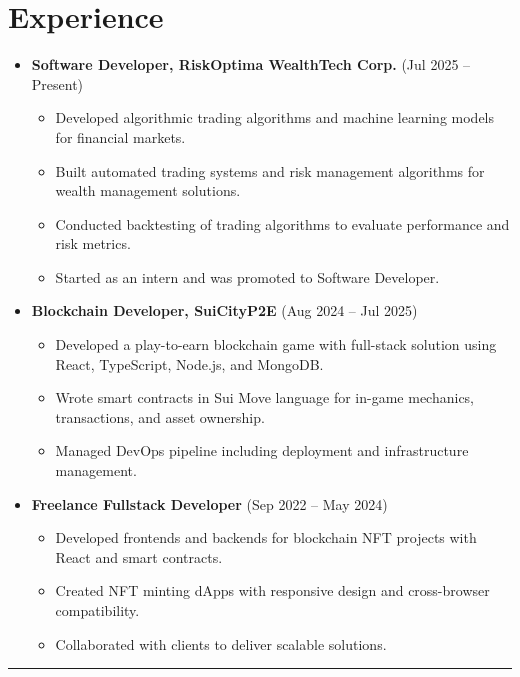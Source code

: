 \documentclass{article}
\begin{document}
\section*{Experience}
\vspace{-0.3em}
\begin{itemize}
    \item \textbf{Software Developer, RiskOptima WealthTech Corp.} (Jul 2025 -- Present)
    \begin{itemize}
        \item Developed algorithmic trading algorithms and machine learning models for financial markets.
        \item Built automated trading systems and risk management algorithms for wealth management solutions.
        \item Conducted backtesting of trading algorithms to evaluate performance and risk metrics.
        \item Started as an intern and was promoted to Software Developer.
    \end{itemize}
    \item \textbf{Blockchain Developer, SuiCityP2E} (Aug 2024 -- Jul 2025)
    \begin{itemize}
        \item Developed a play-to-earn blockchain game with full-stack solution using React, TypeScript, Node.js, and MongoDB.
        \item Wrote smart contracts in Sui Move language for in-game mechanics, transactions, and asset ownership.
        \item Managed DevOps pipeline including deployment and infrastructure management.
    \end{itemize}
    \item \textbf{Freelance Fullstack Developer} (Sep 2022 -- May 2024)
    \begin{itemize}
        \item Developed frontends and backends for blockchain NFT projects with React and smart contracts.
        \item Created NFT minting dApps with responsive design and cross-browser compatibility.
        \item Collaborated with clients to deliver scalable solutions.
    \end{itemize}
\end{itemize}
\hrule
\vspace{0.3em}
\end{document}

